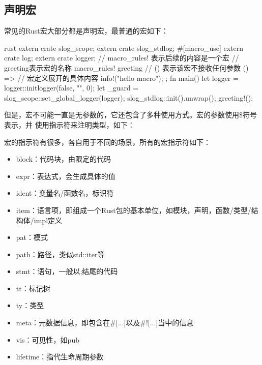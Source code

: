 \subsection{声明宏}
常见的Rust宏大部分都是声明宏，最普通的宏如下：
\begin{code-block}{rust}
extern crate slog_scope;
extern crate slog_stdlog;
#[macro_use]
extern crate log;
extern crate logger;
// macro_rules! 表示后续的内容是一个宏
// greeting表示宏的名称
macro_rules! greeting {
    // () 表示该宏不接收任何参数
    () => {
        // 宏定义展开的具体内容
        info!("hello macro");
    };
}
fn main() {
    let logger = logger::initlogger(false, "", 0);
    let _guard = slog_scope::set_global_logger(logger);
    slog_stdlog::init().unwrap();
    greeting!();
}
\end{code-block}
但是，宏不可能一直是无参数的，它还包含了多种使用方式。宏的参数使用\$符号表示，并
使用指示符来注明类型，如下：
宏的指示符有很多，各自用于不同的场景，所有的宏指示符如下：
\begin{itemize}
  \item block：代码块，由{}限定的代码
  \item expr：表达式，会生成具体的值
  \item ident：变量名/函数名，标识符
  \item item：语言项，即组成一个Rust包的基本单位，如模块，声明，函数/类型/结构体/impl定义
  \item pat：模式
  \item path：路径，类似std::iter等
  \item stmt：语句，一般以;结尾的代码
  \item tt：标记树
  \item ty：类型
  \item meta：元数据信息，即包含在\#[...]以及\#![...]当中的信息
  \item vis：可见性，如pub
  \item lifetime：指代生命周期参数
\end{itemize}

